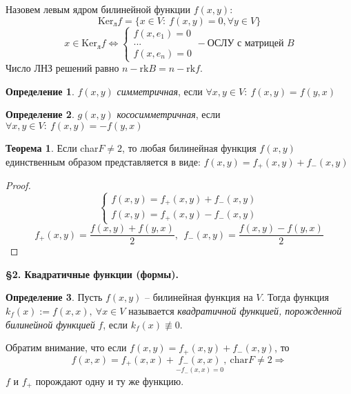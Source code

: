 \documentclass[a4paper, 12pt]{article}
\theoremstyle{definition}
\newtheorem*{definition}{Определение}
\newtheorem*{theorem}{Теорема}
\begin{document}
    Назовем левым ядром билинейной функции $f(x,y):$
    $$\text{Ker}_{\text{л}} f = \{x \in V:\ f(x,y) = 0,\forall
    y \in V\}$$
    $$x \in \text{Ker}_{\text{л}} f \Longleftrightarrow 
    \begin{cases}
        f(x,e_1) = 0\\
        ...\\
        f(x,e_n) = 0
    \end{cases} - \text{ОСЛУ с матрицей }B$$
    Число ЛНЗ решений равно $n - \text{rk}B = n - \text{rk}f$. 
    
    \begin{definition}
        $f(x,y)$ \textit{симметричная}, если $\forall x,y \in V:
        \ f(x,y) = f(y,x)$  
    \end{definition}
    \begin{definition}
        $g(x,y)$ \textit{кососимметричная}, если $\forall x,y
        \in V:\ f(x,y) = -f(y,x)$  
    \end{definition}
    \begin{theorem}
        Если char$F \neq 2$, то любая билинейная функция 
        $f(x,y)$ единственным образом представляется в виде:
        $f(x,y) = f_+(x,y) + f_-(x,y)$
    \end{theorem}
    \begin{proof}
        $$\begin{cases}
            f(x,y) = f_+(x,y) + f_-(x,y)\\
            f(x,y) = f_+(x,y) - f_-(x,y)
        \end{cases}$$
        $$f_+(x,y) = \frac{f(x, y) + f(y,x)}{2},\ 
        \ f_- (x,y) = \frac{f(x,y) - f(y,x)}{2}$$
    \end{proof}
    \begin{center}
        \begin{Large}
            \textbf{\S 2. Квадратичные функции (формы).} 
        \end{Large}
    \end{center}
    \begin{definition}
        Пусть $f(x,y)$ -- билинейная функция на $V$. Тогда 
        функция\\ $k_f(x):= f(x,x),\ \forall x \in V$ 
        называется \textit{квадратичной функцией, 
        порожденной билинейной функцией} $f$, если $k_f(x)
        \not\equiv 0$.
    \end{definition}
    Обратим внимание, что если $f(x,y) = f_+(x,y) + f_-(x,y)$, то 
    $$f(x,x) = f_+(x,x) + \underset{-f_-(x,x) = 0}{f_-(x,x)}
    ,\ \text{char}F \neq 2 \Longrightarrow$$ 
    $f \text{ и } f_+$ порождают одну и ту же функцию.
\end{document}
